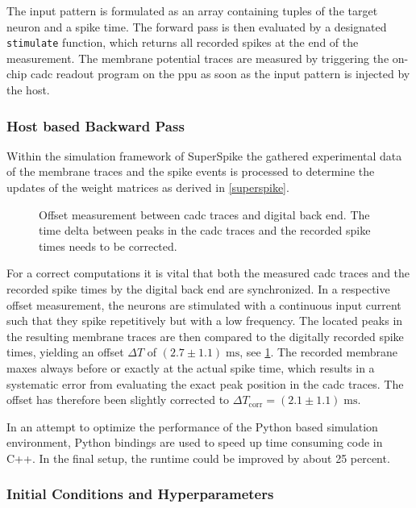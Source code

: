 The input pattern is formulated as an array containing tuples of the target neuron and a spike time. The forward pass is then evaluated by a designated \texttt{stimulate} function, which returns all recorded spikes at the end of the measurement. The membrane potential traces are measured by triggering the on-chip \gls{cadc} readout program on the \gls{ppu} as soon as the input pattern is injected by the host. 

\subsubsection*{Host based Backward Pass}
Within the simulation framework of SuperSpike the gathered experimental data of the membrane traces and the spike events is processed to determine the updates of the weight matrices as derived in \cref{superspike}. 

\begin{figure}
	\centering
	
	\caption[Offset measurement between \acrshort{cadc} traces and digital back end.]{Offset measurement between \acrshort{cadc} traces and digital back end. The time delta between peaks in the \acrshort{cadc} traces and the recorded spike times needs to be corrected.} 
	\label{cadcppuoffset}
\end{figure}

For a correct computations it is vital that both the measured \acrshort{cadc} traces and the recorded spike times by the digital back end are synchronized. In a respective offset measurement, the neurons are stimulated with a continuous input current such that they spike repetitively but with a low frequency. The located peaks in the resulting membrane traces are then compared to the digitally recorded spike times, yielding an offset $\Delta T$ of $(2.7 \pm 1.1)\; \si{\milli \s}$, see \cref{cadcppuoffset}. The recorded membrane maxes always before or exactly at the actual spike time, which results in a systematic error from evaluating the exact peak position in the \acrshort{cadc} traces. The offset has therefore been slightly corrected to $\Delta T_\text{corr} = (2.1 \pm 1.1)\; \si{\milli \s}$. 

In an attempt to optimize the performance of the Python based simulation environment, Python bindings are used to speed up time consuming code in C++. In the final setup, the runtime could be improved by about 25 percent. 

\subsubsection*{Initial Conditions and Hyperparameters}

